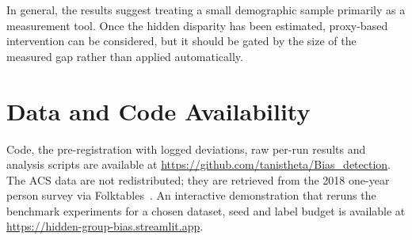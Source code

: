 \documentclass[conference]{IEEEtran}
\begin{document}
In general, the results suggest treating a small demographic sample primarily as a measurement tool. Once the hidden disparity has been estimated, proxy-based intervention can be considered, but it should be gated by the size of the measured gap rather than applied automatically.

\section*{Data and Code Availability}
Code, the pre-registration with logged deviations, raw per-run results and analysis scripts are available at \url{https://github.com/tanistheta/Bias_detection}. The ACS data are not redistributed; they are retrieved from the 2018 one-year person survey via Folktables~\cite{ding2021retiring}. An interactive demonstration that reruns the benchmark experiments for a chosen dataset, seed and label budget is available at \url{https://hidden-group-bias.streamlit.app}.
\end{document}
